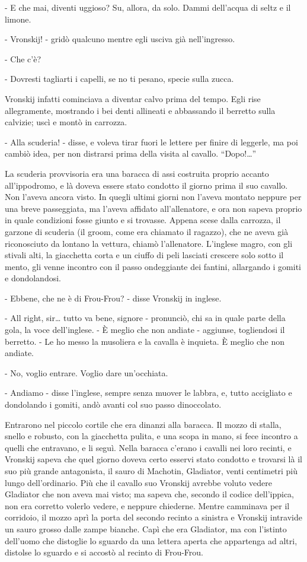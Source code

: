 - E che mai, diventi uggioso? Su, allora, da solo. Dammi dell'acqua di seltz e il limone. 

- Vronskij! - gridò qualcuno mentre egli usciva già nell'ingresso. 

- Che c'è? 

- Dovresti tagliarti i capelli, se no ti pesano, specie sulla zucca. 

Vronskij infatti cominciava a diventar calvo prima del tempo. Egli rise allegramente, mostrando i bei denti allineati e abbassando il berretto sulla calvizie; uscì e montò in carrozza. 

- Alla scuderia! - disse, e voleva tirar fuori le lettere per finire di leggerle, ma poi cambiò idea, per non distrarsi prima della visita al cavallo. ``Dopo!\ldots{}''

\label{xxi-1} 

La scuderia provvisoria era una baracca di assi costruita proprio accanto all'ippodromo, e là doveva essere stato condotto il giorno prima il suo cavallo. Non l'aveva ancora visto. In quegli ultimi giorni non l'aveva montato neppure per una breve passeggiata, ma l'aveva affidato all'allenatore, e ora non sapeva proprio in quale condizioni fosse giunto e si trovasse. Appena scese dalla carrozza, il garzone di scuderia (il groom, come era chiamato il ragazzo), che ne aveva già riconosciuto da lontano la vettura, chiamò l'allenatore. L'inglese magro, con gli stivali alti, la giacchetta corta e un ciuffo di peli lasciati crescere solo sotto il mento, gli venne incontro con il passo ondeggiante dei fantini, allargando i gomiti e dondolandosi. 

- Ebbene, che ne è di Frou-Frou? - disse Vronskij in inglese. 

- All right, sir\ldots{} tutto va bene, signore - pronunciò, chi sa in quale parte della gola, la voce dell'inglese. - È meglio che non andiate - aggiunse, togliendosi il berretto. - Le ho messo la musoliera e la cavalla è inquieta. È meglio che non andiate. 

- No, voglio entrare. Voglio dare un'occhiata. 

- Andiamo - disse l'inglese, sempre senza muover le labbra, e, tutto accigliato e dondolando i gomiti, andò avanti col suo passo dinoccolato. 

Entrarono nel piccolo cortile che era dinanzi alla baracca. Il mozzo di stalla, snello e robusto, con la giacchetta pulita, e una scopa in mano, si fece incontro a quelli che entravano, e li seguì. Nella baracca c'erano i cavalli nei loro recinti, e Vronskij sapeva che quel giorno doveva certo esservi stato condotto e trovarsi là il suo più grande antagonista, il sauro di Machotin, Gladiator, venti centimetri più lungo dell'ordinario. Più che il cavallo suo Vronskij avrebbe voluto vedere Gladiator che non aveva mai visto; ma sapeva che, secondo il codice dell'ippica, non era corretto volerlo vedere, e neppure chiederne. Mentre camminava per il corridoio, il mozzo aprì la porta del secondo recinto a sinistra e Vronskij intravide un sauro grosso dalle zampe bianche. Capì che era Gladiator, ma con l'istinto dell'uomo che distoglie lo sguardo da una lettera aperta che appartenga ad altri, distolse lo sguardo e si accostò al recinto di Frou-Frou. 

